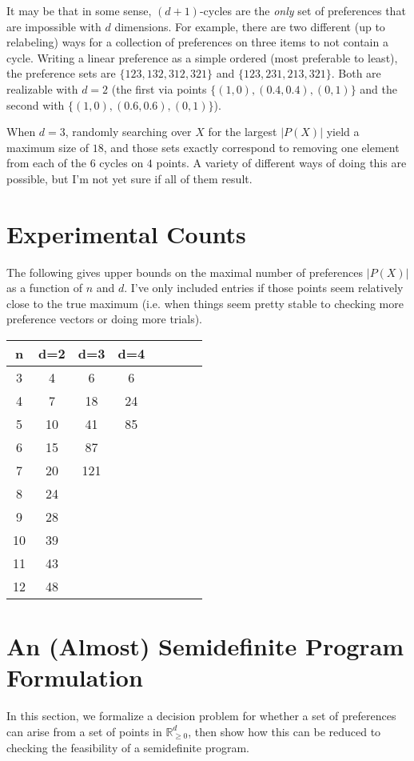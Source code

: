 \documentclass[12pt]{article}
\newcommand{\Rgz}{\mathbb{R}_{\ge 0}}
\newcommand{\1}[1]{\mathds{1}[{#1}]}
\begin{document}

  It may be that in some sense, $(d+1)$-cycles are the \emph{only}
  set of preferences that are impossible with $d$ dimensions.
  For example, there are two different (up to relabeling) ways for
  a collection of preferences on three items to not contain a cycle.
  Writing a linear preference as a simple ordered (most preferable
  to least), the preference sets are $\{ 123, 132, 312, 321\}$ and
  $\{ 123, 231, 213, 321 \}$. Both are realizable with $d=2$
  (the first via points $\{(1,0), (0.4,0.4), (0,1) \}$
  and the second with $\{(1,0), (0.6,0.6), (0,1)\}$).

  When $d=3$, randomly searching over $X$ for the largest $|P(X)|$
  yield a maximum size of $18$, and those sets exactly correspond
  to removing one element from each of the $6$ cycles on $4$ points.
  A variety of different ways of doing this are possible,  but I'm
  not yet sure if all of them result.

\section{Experimental Counts}
  The following gives upper bounds on the maximal number
  of preferences $|P(X)|$ as a function of $n$ and $d$.
  I've only included entries if those points seem relatively
  close to the true maximum (i.e. when things seem pretty stable
  to checking more preference vectors or doing more trials).

  \begin{tabular}{c | c c c c c c c}
    n & d=2 & d=3 & d=4 \\
    \hline
    3  &  4   & 6  & 6  \\
    4  &  7   & 18 & 24 \\
    5  &  10  & 41 & 85 \\
    6  &  15  & 87  \\
    7  &  20  & 121 \\
    8  &  24  \\
    9  &  28  \\
    10 &  39  \\
    11 &  43  \\
    12 &  48  \\
  \end{tabular}

\section{An (Almost) Semidefinite Program Formulation}
  In this section, we formalize a decision problem for whether a set
  of preferences can arise from a set of points in $\Rgz^d$,
  then show how this can be reduced to checking the feasibility
  of a semidefinite program.
\end{document}
